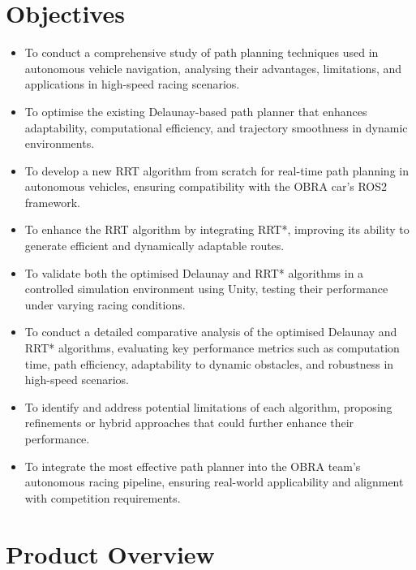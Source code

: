 \documentclass[a4paper,11pt]{report}
\begin{document}
\section{Objectives}
\begin{itemize}
    \item To conduct a comprehensive study of path planning techniques used in autonomous vehicle 
    navigation, analysing their advantages, limitations, and applications in high-speed racing scenarios.
    \item To optimise the existing Delaunay-based path planner that enhances adaptability, 
    computational efficiency, and trajectory smoothness in dynamic environments.
    \item To develop a new RRT algorithm from scratch for real-time path planning 
    in autonomous vehicles, ensuring compatibility with the OBRA car's ROS2 framework.
    \item To enhance the RRT algorithm by integrating RRT*, improving its 
    ability to generate efficient and dynamically adaptable routes.
    \item To validate both the optimised Delaunay and RRT* algorithms in a controlled simulation 
    environment using Unity, testing their performance under varying racing conditions.
    \item To conduct a detailed comparative analysis of the optimised Delaunay and RRT* algorithms, 
    evaluating key performance metrics such as computation time, path efficiency, adaptability to dynamic obstacles, and robustness in high-speed scenarios.
    \item To identify and address potential limitations of each algorithm, 
    proposing refinements or hybrid approaches that could further enhance their performance.
    \item To integrate the most effective path planner into the OBRA team's autonomous racing pipeline, 
    ensuring real-world applicability and alignment with competition requirements.
\end{itemize}


\section{Product Overview}
\end{document}
